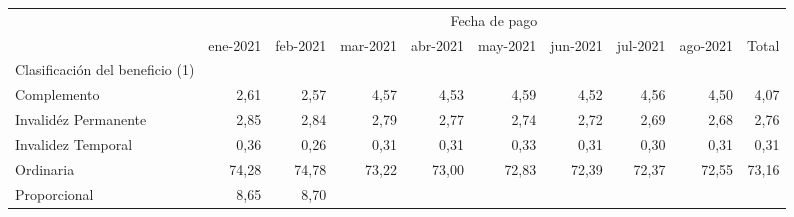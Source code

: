 \begin{tabular}{llllllllll}
\cline{1-10}
\multicolumn{1}{c}{} &
  \multicolumn{9}{|c}{Fecha de pago} \\
\multicolumn{1}{c}{} &
  \multicolumn{1}{|r}{ene-2021} &
  \multicolumn{1}{r}{feb-2021} &
  \multicolumn{1}{r}{mar-2021} &
  \multicolumn{1}{r}{abr-2021} &
  \multicolumn{1}{r}{may-2021} &
  \multicolumn{1}{r}{jun-2021} &
  \multicolumn{1}{r}{jul-2021} &
  \multicolumn{1}{r}{ago-2021} &
  \multicolumn{1}{r}{Total} \\
\cline{1-10}
\multicolumn{1}{l}{Clasificación del beneficio (1)} &
  \multicolumn{1}{|r}{} &
  \multicolumn{1}{r}{} &
  \multicolumn{1}{r}{} &
  \multicolumn{1}{r}{} &
  \multicolumn{1}{r}{} &
  \multicolumn{1}{r}{} &
  \multicolumn{1}{r}{} &
  \multicolumn{1}{r}{} &
  \multicolumn{1}{r}{} \\
\multicolumn{1}{l}{\hspace{1em}Complemento} &
  \multicolumn{1}{|r}{2,61} &
  \multicolumn{1}{r}{2,57} &
  \multicolumn{1}{r}{4,57} &
  \multicolumn{1}{r}{4,53} &
  \multicolumn{1}{r}{4,59} &
  \multicolumn{1}{r}{4,52} &
  \multicolumn{1}{r}{4,56} &
  \multicolumn{1}{r}{4,50} &
  \multicolumn{1}{r}{4,07} \\
\multicolumn{1}{l}{\hspace{1em}Invalidéz Permanente} &
  \multicolumn{1}{|r}{2,85} &
  \multicolumn{1}{r}{2,84} &
  \multicolumn{1}{r}{2,79} &
  \multicolumn{1}{r}{2,77} &
  \multicolumn{1}{r}{2,74} &
  \multicolumn{1}{r}{2,72} &
  \multicolumn{1}{r}{2,69} &
  \multicolumn{1}{r}{2,68} &
  \multicolumn{1}{r}{2,76} \\
\multicolumn{1}{l}{\hspace{1em}Invalidez Temporal} &
  \multicolumn{1}{|r}{0,36} &
  \multicolumn{1}{r}{0,26} &
  \multicolumn{1}{r}{0,31} &
  \multicolumn{1}{r}{0,31} &
  \multicolumn{1}{r}{0,33} &
  \multicolumn{1}{r}{0,31} &
  \multicolumn{1}{r}{0,30} &
  \multicolumn{1}{r}{0,31} &
  \multicolumn{1}{r}{0,31} \\
\multicolumn{1}{l}{\hspace{1em}Ordinaria} &
  \multicolumn{1}{|r}{74,28} &
  \multicolumn{1}{r}{74,78} &
  \multicolumn{1}{r}{73,22} &
  \multicolumn{1}{r}{73,00} &
  \multicolumn{1}{r}{72,83} &
  \multicolumn{1}{r}{72,39} &
  \multicolumn{1}{r}{72,37} &
  \multicolumn{1}{r}{72,55} &
  \multicolumn{1}{r}{73,16} \\
\multicolumn{1}{l}{\hspace{1em}Proporcional} &
  \multicolumn{1}{|r}{8,65} &
  \multicolumn{1}{r}{8,70} &

\end{tabular}
